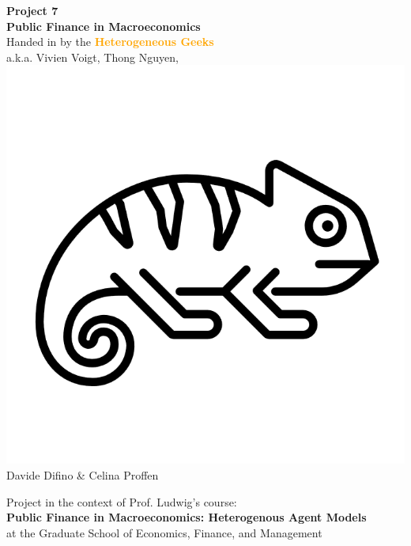 \documentclass[12pt,a4paper]{article}
\begin{document}
\begin{center}
       \vspace*{4cm}
       \huge\textbf{Project 7} \\
       \vspace{0.4cm}
       \large \textbf{Public Finance in Macroeconomics} \\
       \vspace{0.5cm}
        \large Handed in by the \textcolor{orange}{\textbf{Heterogeneous Geeks}} \\
        \vspace{0.3cm}
        a.k.a. Vivien Voigt, Thong Nguyen, \includegraphics[scale=0.06]{geek.png}\\Davide Difino \& Celina Proffen \\
       \vspace{1.5cm}
       \vfill



        Project in the context of Prof. Ludwig's course: \\
        \textbf{Public Finance in Macroeconomics: Heterogenous Agent Models}\\
        at the Graduate School of Economics, Finance, and Management
       \vspace{0.8cm}
   \end{center}
\end{document}
